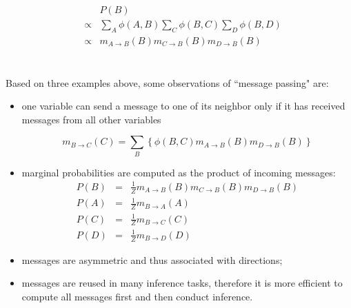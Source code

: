 \begin{minipage}[c]{0.6\textwidth}
 \begin{equation*}
  \begin{array}{rcl}
  & & P(B) \\
  &\propto& \sum_{A}\phi(A,B) \sum_C \phi(B,C) \sum_D \phi(B,D)\\  
  &\propto& m_{A\rightarrow B}(B) m_{C\rightarrow B} (B) m_{D\rightarrow B}(B)  \\
  \end{array}
 \end{equation*}
\end{minipage}\\

Based on three examples above, some observations of ``message passing" are:  
\begin{itemize}
	\item  one variable can send a message to one of its neighbor only if it has received messages from all other variables  

  \begin{equation*}
   m_{B\rightarrow C}(C)=\sum_{B} \left\{   \phi(B,C) m_{A\rightarrow B}(B) m_{D\rightarrow B}(B) \right\}
  \end{equation*}

 \item marginal probabilities are computed as the product of incoming messages:
  \begin{equation*}
  \begin{array}{rcl}
   P(B)&=&\frac{1}{Z}m_{A\rightarrow B}(B) m_{C\rightarrow B} (B) m_{D\rightarrow B}(B)\\
   P(A)&=&\frac{1}{Z}m_{B\rightarrow A}(A) \\
   P(C)&=&\frac{1}{Z}m_{B\rightarrow C}(C) \\
   P(D)&=&\frac{1}{Z}m_{B\rightarrow D}(D) 
  \end{array}
 \end{equation*}
 \item messages are asymmetric and thus associated with directions;       
 \item messages are reused in many inference tasks, therefore it is more efficient to compute all messages first and 
	 then conduct inference. 
\end{itemize}

